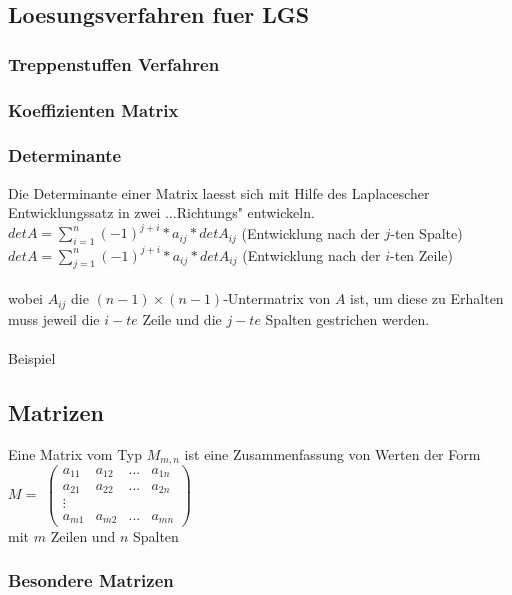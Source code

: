 \documentclass[a4paper]{article} %
\begin{document}
	\subsection{Loesungsverfahren fuer LGS}
	\subsubsection{Treppenstuffen Verfahren}
	\subsubsection{Koeffizienten Matrix}
	\pagebreak

	\subsubsection{Determinante}
	Die Determinante einer Matrix laesst sich mit Hilfe des Laplacescher Entwicklungssatz in zwei ...Richtungs" entwickeln.\\
	$det A = \sum\limits_{i=1}^{n}(-1)^{j+i}*a_{ij}*detA_{ij} $ (Entwicklung nach der $j$-ten Spalte)\\
	$det A = \sum\limits_{j=1}^{n}(-1)^{j+i}*a_{ij}*detA_{ij} $ (Entwicklung nach der $i$-ten Zeile)\\\\
	wobei $A_{ij}$ die ${(n-1)} \times {(n-1)}$-Untermatrix von $A$ ist, um diese zu Erhalten muss jeweil die $i-te$ Zeile und die $j-te$ Spalten gestrichen werden.
	\\\\Beispiel
	\subsection{Matrizen}
	 \hspace{0 cm}
	Eine Matrix vom Typ $M_{m,n}$ ist eine Zusammenfassung von Werten der Form $M =$
	$
	\begin{pmatrix}
		a_{11} & a_{12} & ... 	& a_{1n}\\
		a_{21} & a_{22} & ...		 & a_{2n}\\
	      \vdots    	&      &	    \\
		a_{m1} & a_{m2} & ...	& a_{mn}
	\end{pmatrix}
	$\\
	 mit $m$ Zeilen und $n$ Spalten
	\subsubsection{Besondere Matrizen}
\end{document}
